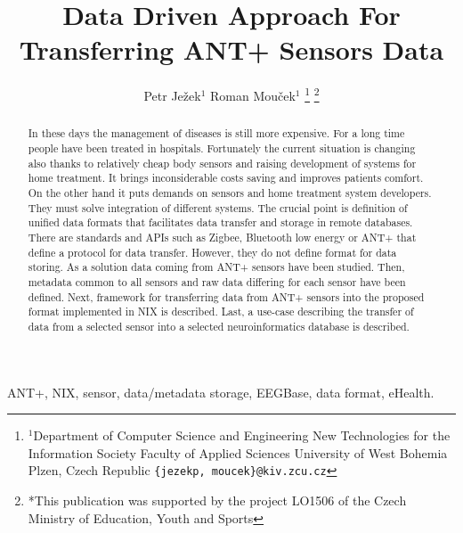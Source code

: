 \documentclass[conference]{IEEEtran}
\begin{document}
  \title{Data Driven Approach For Transferring ANT+ Sensors Data}

  \author{{Petr Je\v{z}ek$^{1}$ Roman Mou\v{c}ek$^{1}$}
\thanks{$^{1}$Department of Computer Science and Engineering
New Technologies for the Information Society
Faculty of Applied Sciences
University of West Bohemia
Plzen, Czech Republic
        {\tt\small \{jezekp, moucek\}@kiv.zcu.cz}}%
\thanks{*This publication was supported by the project LO1506 of the Czech Ministry of Education, Youth and Sports}%
}
\maketitle



\begin{abstract}
In these days the management of diseases is still more expensive. For a long time people have been treated in hospitals. Fortunately the current situation is changing also thanks to relatively cheap body sensors and raising development of systems for home treatment. It brings inconsiderable costs saving and improves patients comfort. On the other hand it puts demands on sensors and home treatment system developers. They must solve integration of different systems. The crucial point is definition of unified data formats that facilitates data transfer and storage in remote databases. There are standards and APIs such as Zigbee, Bluetooth low energy or ANT+ that define a protocol for data transfer. However, they do not define format for data storing. As a solution data coming from ANT+ sensors have been studied. Then, metadata common to all sensors and raw data differing for each sensor have been defined. Next, framework for transferring data from ANT+ sensors into the proposed format implemented in NIX is described. Last, a use-case describing the transfer of data from a selected sensor into a selected neuroinformatics database is described.



\end{abstract}

\begin{IEEEkeywords}
ANT+, NIX, sensor, data/metadata storage, EEGBase, data format, eHealth.
\end{IEEEkeywords}
\end{document}
